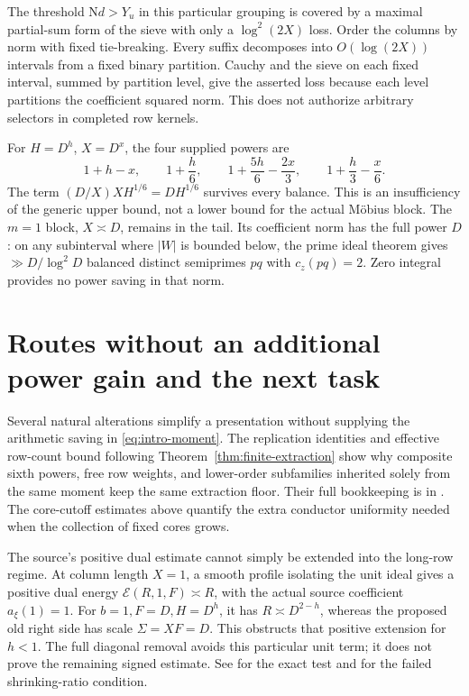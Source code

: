 \documentclass[11pt]{article}
\numberwithin{equation}{section}
\theoremstyle{definition}
\theoremstyle{remark}
\newcommand{\N}{\mathrm N}
\begin{document}
The threshold \(\N d>Y_u\) in this particular grouping is covered
by a maximal partial-sum form of the sieve with only a
\(\log^2(2X)\) loss. Order the columns by norm with fixed tie-breaking.
Every suffix decomposes into \(O(\log(2X))\) intervals from a fixed
binary partition. Cauchy and the sieve on each fixed interval,
summed by partition level, give the asserted loss because each level
partitions the coefficient squared norm.
This does not authorize arbitrary selectors in completed row kernels.

For \(H=D^h\), \(X=D^x\), the four supplied powers are
\[
 1+h-x,\qquad 1+\frac h6,\qquad
 1+\frac{5h}{6}-\frac{2x}{3},\qquad
 1+\frac h3-\frac x6.
\]
The term \((D/X)XH^{1/6}=DH^{1/6}\) survives every balance.
This is an insufficiency of the generic upper bound, not a lower
bound for the actual M\"obius block.
The \(m=1\) block, \(X\asymp D\), remains in the tail.
Its coefficient norm has the full power \(D\): on any subinterval
where \(|W|\) is bounded below, the prime ideal theorem gives
\(\gg D/\log^2D\) balanced distinct semiprimes \(pq\) with
\(c_z(pq)=2\).
Zero integral provides no power saving in that norm.

\section{Routes without an additional power gain and the next task}
\label{sec:limits}

Several natural alterations simplify a presentation without supplying
the arithmetic saving in \eqref{eq:intro-moment}.
The replication identities and effective row-count bound following
Theorem~\ref{thm:finite-extraction} show why composite sixth powers,
free row weights, and lower-order subfamilies inherited solely from
the same moment keep the same extraction floor. Their full
bookkeeping is in \cite{N5}.
The core-cutoff estimates above quantify the extra conductor
uniformity needed when the collection of fixed cores grows.

The source's positive dual estimate cannot simply be extended into
the long-row regime. At column length \(X=1\), a smooth profile
isolating the unit ideal gives a positive dual energy
\(\mathcal E(R,1,F)\asymp R\), with the actual source coefficient
\(a_\xi(1)=1\).
For \(b=1,F=D,H=D^h\), it has \(R\asymp D^{2-h}\),
whereas the proposed old right side has scale \(\Sigma=XF=D\).
This obstructs that positive extension for \(h<1\).
The full diagonal removal avoids this particular unit term;
it does not prove the remaining signed estimate.
See \cite{N2} for the exact test and \cite{N1} for the failed
shrinking-ratio condition.
\end{document}
